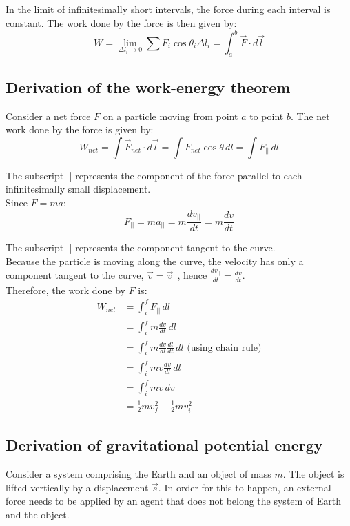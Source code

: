 \documentclass[11pt]{article}
\begin{document}
In the limit of infinitesimally short intervals, the force during each interval is constant. The work done by the force is then given by:
\[W = \lim_{\Delta l_i \rightarrow 0} \sum F_i \cos \theta_i \Delta l_i = \int_a^b \vec{F} \cdot d \vec{l}\]

\newpage

\subsection{Derivation of the work-energy theorem}
\label{sec:org0b7e184}
Consider a net force \(F\) on a particle moving from point \(a\) to point \(b\). The net work done by the force is given by:
\[W_{net} = \int \vec{F}_{net} \cdot d \vec{l} = \int F_{net} \cos \theta \, dl = \int F_{||} \, dl\]

The subscript || represents the component of the force parallel to each infinitesimally small displacement.
\\[0pt]

Since \(F = ma\):
\[F_{||} = ma_{||} = m \frac{dv_{||}}{dt} = m \frac{dv}{dt}\]

The subscript || represents the component tangent to the curve.
\\[0pt]

Because the particle is moving along the curve, the velocity has only a component tangent to the curve, \(\vec{v} = \vec{v}_{||}\), hence \(\frac{dv_{||}}{dt} = \frac{dv}{dt}\).
\\[0pt]

Therefore, the work done by \(F\) is:
\begin{align*}
W_{net} &= \int_i^f F_{||} \, dl \\
&= \int_i^f m \frac{dv}{dt} \, dl \\
&= \int_i^f m \frac{dv}{dl} \frac{dl}{dt} \, dl \text{ (using chain rule)} \\
&= \int_i^f mv \frac{dv}{dl} \, dl \\
&= \int_i^f mv \, dv \\
&= \frac{1}{2}mv_f^2 - \frac{1}{2}mv_i^2
\end{align*}

\newpage

\subsection{Derivation of gravitational potential energy}
\label{sec:orgd51f4df}
Consider a system comprising the Earth and an object of mass \(m\). The object is lifted vertically by a displacement \(\vec{s}\). In order for this to happen, an external force needs to be applied by an agent that does not belong the system of Earth and the object.
\\[0pt]
\end{document}
